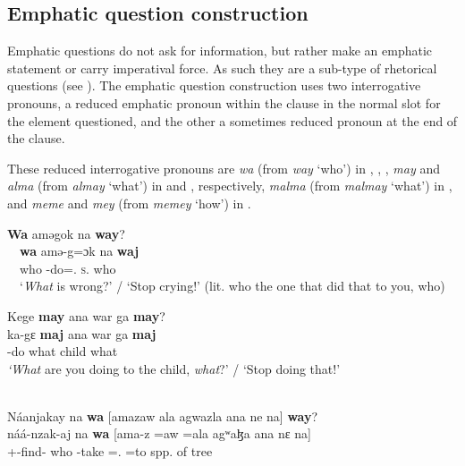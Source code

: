 \subsection{Emphatic question construction}\label{sec:10.3.5}
\hypertarget{RefHeading1213081525720847}{}
Emphatic questions do not ask for information, but rather make an emphatic statement or carry imperatival force. As such they are a sub-type of rhetorical questions (see ). The emphatic question construction uses two interrogative pronouns, a reduced emphatic pronoun within the clause in the normal slot for the element questioned, and the other a sometimes reduced pronoun at the end of the clause. 

These reduced interrogative pronouns are \textit{wa} (from \textit{way} ‘who’) in , , , \textit{may} and \textit{alma} (from \textit{almay} ‘what’) in  and , respectively, \textit{malma} (from \textit{malmay} ‘what’) in , and \textit{meme} and \textit{mey} (from \textit{memey} ‘how’) in .

\ea \label{ex:10:100}
\textbf{Wa}  aməgok  na  \textbf{way}?\\
\gll  \ \ \textbf{wa}    amə-g=ɔk  na  \textbf{waj}\\
      \ \ who    {\DEP}-do={\twoS}.{\IO}  \textsc{s}.{\DO}  who\\
\glt  \ \ ‘\textit{What} is wrong?’ / ‘Stop crying!’ (lit. who the one that did that to you, who) 
\z 

\ea \label{ex:10:101}
Kege  \textbf{may} ana  war  ga  \textbf{may}?\\
\gll  ka-gɛ  \textbf{maj} ana  war  ga  \textbf{maj}\\
      {\twoS}-do  what  {\DAT} child  {\ADJ}  what\\
\glt  \textit{‘What} are you doing to the child, \textit{what}?’ / ‘Stop doing that!’
\z 

\ea \label{ex:10:102}
\\
Náanjakay  na  \textbf{wa}  [amazaw  ala  agwazla  ana  ne   na]  \textbf{way}?\\
\gll  náá-nzak-aj     na  \textbf{wa}    [ama-z  =aw   =ala  agʷaɮa    ana   nɛ    na] \\    
      {\oneS}+{\POT}{}-find{}-{\CL} {\PSP} who   {\DEP}-take  ={\oneS}.{\IO}   =to    {spp. of tree}     {\DAT} {\oneS}    {\PSP}\\   
      
